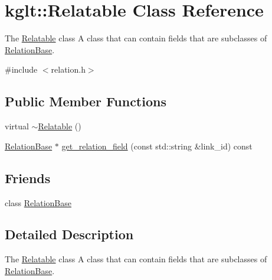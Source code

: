\hypertarget{classkglt_1_1_relatable}{\section{kglt\-:\-:Relatable Class Reference}
\label{classkglt_1_1_relatable}
}


The \hyperlink{classkglt_1_1_relatable}{Relatable} class A class that can contain fields that are subclasses of \hyperlink{classkglt_1_1_relation_base}{Relation\-Base}.  




{\ttfamily \#include $<$relation.\-h$>$}

\subsection*{Public Member Functions}
\begin{DoxyCompactItemize}
\item 
virtual \hyperlink{classkglt_1_1_relatable_aa24e3af40d467c78c4d7982594ae9458}{$\sim$\-Relatable} ()
\item 
\hyperlink{classkglt_1_1_relation_base}{Relation\-Base} $\ast$ \hyperlink{classkglt_1_1_relatable_a881af2ba5a3ad1e2c7f07519851da3ed}{get\-\_\-relation\-\_\-field} (const std\-::string \&link\-\_\-id) const 
\end{DoxyCompactItemize}
\subsection*{Friends}
\begin{DoxyCompactItemize}
\item 
class \hyperlink{classkglt_1_1_relatable_a49d950c0624ec0835078aea71d9a3cbe}{Relation\-Base}
\end{DoxyCompactItemize}


\subsection{Detailed Description}
The \hyperlink{classkglt_1_1_relatable}{Relatable} class A class that can contain fields that are subclasses of \hyperlink{classkglt_1_1_relation_base}{Relation\-Base}. 

